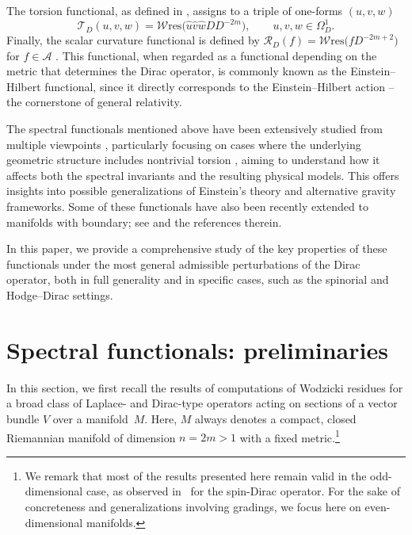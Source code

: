 \documentclass[10pt,a4paper]{amsart}
\numberwithin{equation}{section}
\theoremstyle{definition}
\def\W{\mathscr{W} \mathrm{res}}
\begin{document}
The torsion functional, as defined in \cite[Definition~2.1]{dabrowski2024}, assigns to a triple of one-forms $(u,v,w)$
\[
	\mathscr{T}_D(u,v,w)= \W\bigl(\hat{u}\hat{v}\hat{w}D D^{-2m}\bigr), \qquad u,v,w\in \Omega^1_D.
\]
Finally, the scalar curvature functional is defined by $\mathscr{R}_D(f)=\W\bigl(fD^{-2m+2}\bigr)$ for $f\in \mathcal{A}$ \cite{Ackermann96,Kalau95}. This functional, when regarded as a functional depending on the metric that determines the Dirac operator, is commonly known as the Einstein--Hilbert functional, since it directly corresponds to the Einstein--Hilbert action -- the cornerstone of general relativity.

The spectral functionals mentioned above have been extensively studied from multiple viewpoints \cite{dabrowski2023,dabrowski2024, dabrowski2024a}, particularly focusing on cases where the underlying geometric structure includes nontrivial torsion \cite{bochniak2025,dabrowski2025}, aiming to understand how it affects both the spectral invariants and the resulting physical models. This offers insights into possible generalizations of Einstein’s theory and alternative gravity frameworks. Some of these functionals have also been recently extended to manifolds with boundary; see \cite{Yang24} and the references therein.

In this paper, we provide a comprehensive study of the key properties of these functionals under the most general admissible perturbations of the Dirac operator, both in full generality and in specific cases, such as the spinorial and Hodge--Dirac settings.

\section{Spectral functionals: preliminaries}
\label{sec:general}
In this section, we first recall the results of computations of Wodzicki residues for a broad class of Laplace- and Dirac-type operators acting on sections of a vector bundle $V$ over a manifold~$M$. Here, $M$ always denotes a compact, closed Riemannian manifold of dimension $n = 2m > 1$ with a fixed metric.\footnote{We remark that most of the results presented here remain valid in the odd-dimensional case, as observed in~\cite{bochniak2025} for the spin-Dirac operator. For the sake of concreteness and generalizations involving gradings, we focus here on even-dimensional manifolds.}
\end{document}
